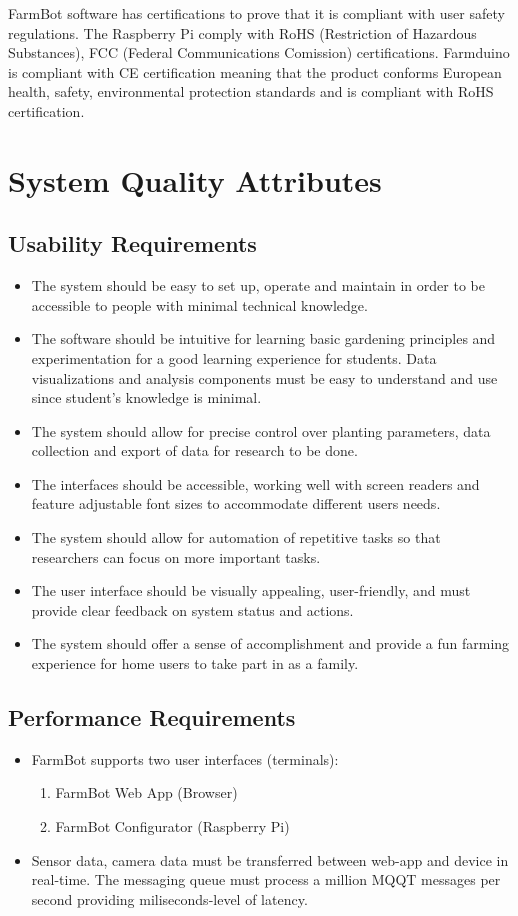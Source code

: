 FarmBot software has certifications to prove that it is compliant with user safety regulations. The Raspberry Pi comply with RoHS (Restriction of Hazardous Substances), FCC (Federal Communications Comission) certifications. Farmduino is compliant with CE certification meaning that the product conforms European health, safety, environmental protection standards and is compliant with RoHS certification.

\section{System Quality Attributes}

\subsection{Usability Requirements}
\begin{itemize}
    \item The system should be easy to set up, operate and maintain in order to be accessible to people with minimal technical knowledge.
    \item The software should be intuitive for learning basic gardening principles and experimentation for a good learning experience for students. Data visualizations and analysis components must be easy to understand and use since student's knowledge is minimal.
    \item The system should allow for precise control over planting parameters, data collection and export of data for research to be done.
    \item The interfaces should be accessible, working well with screen readers and feature adjustable font sizes to accommodate different users needs.
    \item The system should allow for automation of repetitive tasks so that researchers can focus on more important tasks.
    \item The user interface should be visually appealing, user-friendly, and must provide clear feedback on system status and actions.
    \item The system should offer a sense of accomplishment and provide a fun farming experience for home users to take part in as a family.
\end{itemize}

\subsection{Performance Requirements}
\begin{itemize}
    \item FarmBot supports two user interfaces (terminals):
    \begin{enumerate}
        \item FarmBot Web App (Browser)
        \item FarmBot Configurator (Raspberry Pi)
    \end{enumerate}
    \item Sensor data, camera data must be transferred between web-app and device in real-time. The messaging queue must process a million MQQT messages per second providing miliseconds-level of latency. 
\end{itemize}

